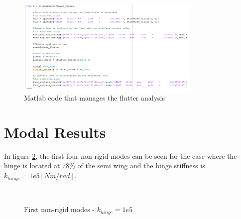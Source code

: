\documentclass[conference]{IEEEtran}
\newlength\figureheight
\newlength\figurewidth
\begin{document}
\begin{figure}[htp]
  \centering
  \setlength\figureheight{5cm}
  \setlength\figurewidth{6cm}
  \includegraphics[width=250pt]{images/MatlabCode.png}
  \caption{Matlab code that manages the flutter analysis}
  \label{fig:MatlabCode}
\end{figure}


\section{Modal Results}

In figure \ref{fig:non-rigid modes}, the first four non-rigid modes can be seen for the case where the hinge is located at 78\% of the semi wing and the hinge stiffness is $k_{hinge} = 1e5 [Nm/rad]$. 


\begin{figure}
\centering
{}\:\:\: 
\\
\:\:\: 
\caption{First non-rigid modes - $k_{hinge} = 1e5$}
\label{fig:non-rigid modes}
\end{figure}
\end{document}
